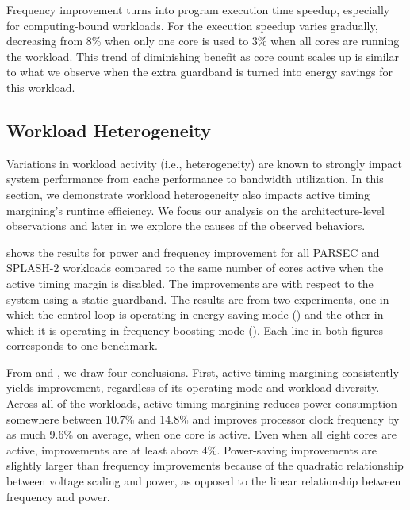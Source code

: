Frequency improvement turns into program execution time speedup, especially for computing-bound workloads. For  the execution speedup varies gradually, decreasing from 8\% when only one core is used to 3\% when all cores are running the workload. This trend of diminishing benefit as core count scales up is similar to what we observe when the extra guardband is turned into energy savings for this workload. 

\subsection{Workload Heterogeneity}
\label{sec:voltage:characterization:workload-variation}

Variations in workload activity (i.e., heterogeneity) are known to strongly impact system performance from cache performance to bandwidth utilization. In this section, we demonstrate workload heterogeneity also impacts active timing margining's runtime efficiency. We focus our analysis on the architecture-level observations and later in  we explore the causes of the observed behaviors.

 shows the results for power and frequency improvement for all PARSEC and SPLASH-2 workloads compared to the same number of cores active when the active timing margin is disabled. The improvements are with respect to the system using a static guardband. The results are from two experiments, one in which the control loop is operating in energy-saving mode () and the other in which it is operating in frequency-boosting mode (). Each line in both figures corresponds to one benchmark.

From  and , we draw four conclusions. First, active timing margining consistently yields improvement, regardless of its operating mode and workload diversity. Across all of the workloads, active timing margining reduces power consumption somewhere between 10.7\% and 14.8\% and improves processor clock frequency by as much 9.6\% on average, when one core is active. Even when all eight cores are active, improvements are at least above 4\%. Power-saving improvements are slightly larger than frequency improvements because of the quadratic relationship between voltage scaling and power, as opposed to the linear relationship between frequency and power.

